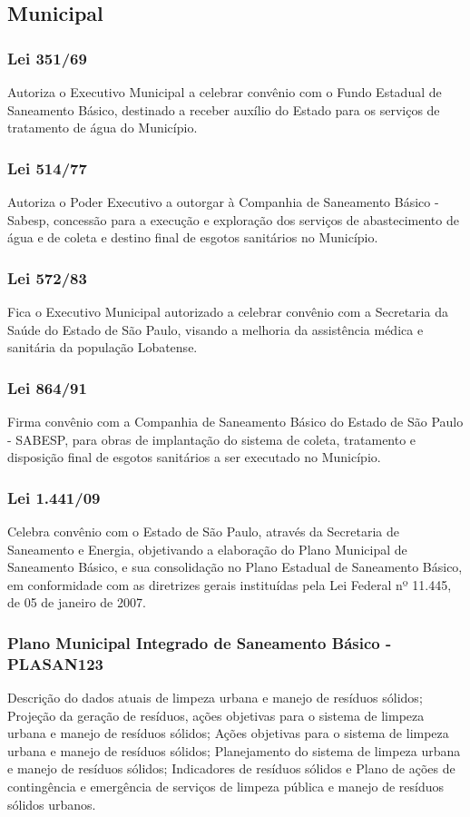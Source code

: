\begin{subapend}
	\subsection{Municipal}
	\begin{subsubapend}
		\subsubsection{Lei 351/69}
		Autoriza o Executivo Municipal a celebrar convênio com o Fundo Estadual de Saneamento Básico, destinado a receber auxílio do Estado para os serviços de tratamento de água do Município.
		\subsubsection{Lei 514/77}
		Autoriza o Poder Executivo a outorgar à Companhia de Saneamento Básico - Sabesp, concessão para a execução e exploração dos serviços de abastecimento de água e de coleta e destino final de esgotos sanitários no Município.
		\subsubsection{Lei 572/83}
		Fica o Executivo Municipal autorizado a celebrar convênio com a Secretaria da Saúde do Estado de São Paulo, visando a melhoria da assistência médica e sanitária da população Lobatense.
		\subsubsection{Lei 864/91}
		Firma convênio com a Companhia de Saneamento Básico do Estado de São Paulo - SABESP, para obras de implantação do sistema de coleta, tratamento e disposição final de esgotos sanitários a ser executado no Município.
		\subsubsection{Lei 1.441/09}
		Celebra convênio com o Estado de São Paulo, através da Secretaria de Saneamento e Energia, objetivando a elaboração do Plano Municipal de Saneamento Básico, e sua consolidação no Plano Estadual de Saneamento Básico, em conformidade com as diretrizes gerais instituídas pela Lei Federal nº 11.445, de 05 de janeiro de 2007.
		\subsubsection{Plano Municipal Integrado de Saneamento Básico - PLASAN123}
		Descrição do dados atuais de limpeza urbana e manejo de resíduos sólidos; Projeção da geração de resíduos, ações objetivas para o sistema de limpeza urbana e manejo de resíduos sólidos; Ações objetivas para o sistema de limpeza urbana e manejo de resíduos sólidos; Planejamento do sistema de limpeza urbana e manejo de resíduos sólidos; Indicadores de resíduos sólidos e Plano de ações de contingência e emergência de serviços de limpeza pública e manejo de resíduos sólidos urbanos.

\end{subsubapend}
\end{subapend}
